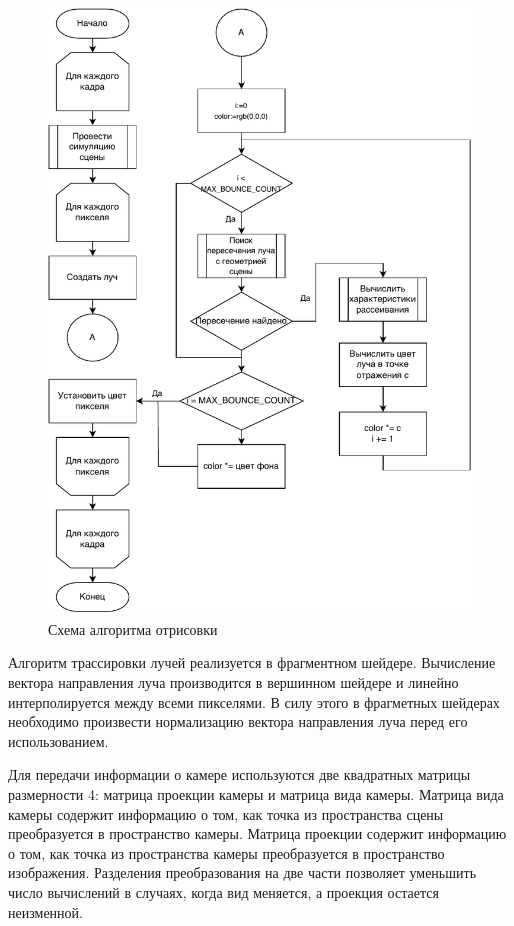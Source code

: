 \begin{figure}[H]
	\centering
	\includegraphics[width=120mm]{inc/pdf/app_algo}
	\caption{Схема алгоритма отрисовки}
	\label{img:app_algo}
\end{figure}

Алгоритм трассировки лучей реализуется в фрагментном шейдере.
Вычисление вектора направления луча производится в вершинном
шейдере и линейно интерполируется между всеми пикселями. В силу этого 
в фрагметных шейдерах необходимо произвести нормализацию вектора направления луча
перед его использованием.

Для передачи информации о камере используются две квадратных матрицы размерности 4: матрица проекции камеры и матрица вида камеры. Матрица вида камеры содержит информацию о том, 
как точка из пространства сцены преобразуется в пространство камеры. Матрица проекции 
содержит информацию о том, как точка из пространства камеры преобразуется в пространство 
изображения. Разделения преобразования на две части позволяет уменьшить число вычислений 
в случаях, когда вид меняется, а проекция остается неизменной.

